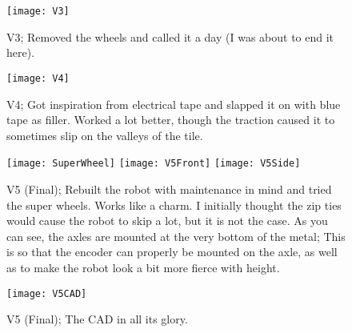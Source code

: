 \begin{figure}[h]
    \centering
    \texttt{[image: V3]}
    \caption{
        V3; Removed the wheels and called it a day (I was about to end it here).
    }
\end{figure}

\begin{figure}[h]
    \centering
    \texttt{[image: V4]}
    \caption{
        V4; Got inspiration from electrical tape and slapped it on with blue tape as filler. Worked a lot better, though the traction caused it to sometimes slip on the valleys of the tile.
    }
\end{figure}

\begin{figure}[h]
    \centering
    \texttt{[image: SuperWheel]}
    \texttt{[image: V5Front]}
    \texttt{[image: V5Side]}
    \caption{
        V5 (Final); Rebuilt the robot with maintenance in mind and tried the super wheels. Works like a charm. I initially thought the zip ties would cause the robot to skip a lot, but it is not the case. As you can see, the axles are mounted at the very bottom of the metal; This is so that the encoder can properly be mounted on the axle, as well as to make the robot look a bit more fierce with height.
    }
\end{figure}


\begin{figure}[h]
    \centering
    \texttt{[image: V5CAD]}
    \caption{
        V5 (Final); The CAD in all its glory.
    }
\end{figure}
